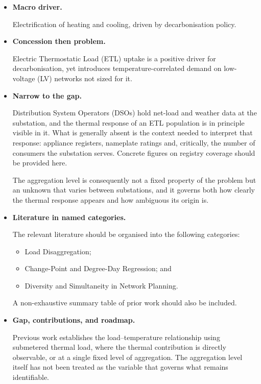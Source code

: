 \documentclass[9pt,journal,a4]{IEEEtran}
\begin{document}
\begin{itemize}

\item \textbf{Macro driver.}

Electrification of heating and cooling, driven by decarbonisation policy.


\item \textbf{Concession then problem.}

Electric Thermostatic Load (ETL) uptake is a positive driver for decarbonisation, yet introduces temperature-correlated demand on low-voltage (LV) networks not sized for it.


\item \textbf{Narrow to the gap.}

Distribution System Operators (DSOs) hold net-load and weather data at the substation, and the thermal response of an ETL population is in principle visible in it. What is generally absent is the context needed to interpret that response: appliance registers, nameplate ratings and, critically, the number of consumers the substation serves. Concrete figures on registry coverage should be provided here.

The aggregation level is consequently not a fixed property of the problem but an unknown that varies between substations, and it governs both how clearly the thermal response appears and how ambiguous its origin is.


\item \textbf{Literature in named categories.}

The relevant literature should be organised into the following categories:

\begin{itemize}

\item Load Disaggregation;

\item Change-Point and Degree-Day Regression; and

\item Diversity and Simultaneity in Network Planning.

\end{itemize}

A non-exhaustive summary table of prior work should also be included.


\item \textbf{Gap, contributions, and roadmap.}

Previous work establishes the load--temperature relationship using submetered thermal load, where the thermal contribution is directly observable, or at a single fixed level of aggregation. The aggregation level itself has not been treated as the variable that governs what remains identifiable.


\end{itemize}
\end{document}

